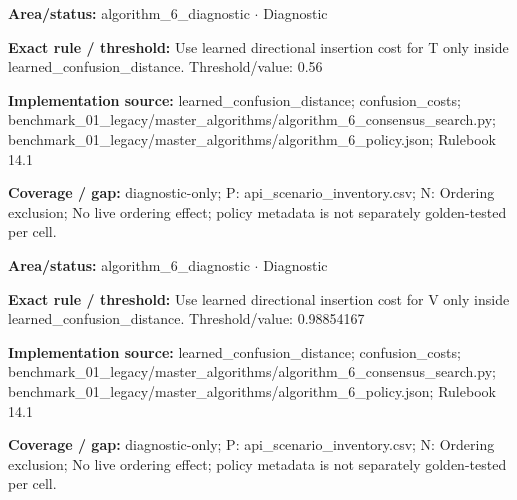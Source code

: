 \begin{tcolorbox}[enhanced,breakable,colback=white,colframe=Muted!45,boxrule=0.45pt,arc=1.5pt,left=6pt,right=6pt,top=5pt,bottom=5pt,title={\texttt{A6-LEARNED-INSERTION-T}},title after break={\texttt{A6-LEARNED-INSERTION-T}\ (continued)},fonttitle=\headingfont\bfseries\color{Navy},coltitle=Navy]
\textbf{Area/status:} algorithm\_\allowbreak{}6\_\allowbreak{}diagnostic $\boldsymbol{\cdot}$ Diagnostic\par
\smallskip
\textbf{Exact rule / threshold:} Use learned directional insertion cost for T only inside learned\_\allowbreak{}confusion\_\allowbreak{}distance. Threshold/\allowbreak{}value: 0.56\par
\smallskip
\textbf{Implementation source:} learned\_\allowbreak{}confusion\_\allowbreak{}distance; confusion\_\allowbreak{}costs; benchmark\_\allowbreak{}01\_\allowbreak{}legacy/\allowbreak{}master\_\allowbreak{}algorithms/\allowbreak{}algorithm\_\allowbreak{}6\_\allowbreak{}consensus\_\allowbreak{}search.py; benchmark\_\allowbreak{}01\_\allowbreak{}legacy/\allowbreak{}master\_\allowbreak{}algorithms/\allowbreak{}algorithm\_\allowbreak{}6\_\allowbreak{}policy.json; Rulebook 14.1\par
\smallskip
\textbf{Coverage / gap:} diagnostic-only; P: api\_\allowbreak{}scenario\_\allowbreak{}inventory.csv; N: Ordering exclusion; No live ordering effect; policy metadata is not separately golden-tested per cell.
\end{tcolorbox}
\begin{tcolorbox}[enhanced,breakable,colback=white,colframe=Muted!45,boxrule=0.45pt,arc=1.5pt,left=6pt,right=6pt,top=5pt,bottom=5pt,title={\texttt{A6-LEARNED-INSERTION-V}},title after break={\texttt{A6-LEARNED-INSERTION-V}\ (continued)},fonttitle=\headingfont\bfseries\color{Navy},coltitle=Navy]
\textbf{Area/status:} algorithm\_\allowbreak{}6\_\allowbreak{}diagnostic $\boldsymbol{\cdot}$ Diagnostic\par
\smallskip
\textbf{Exact rule / threshold:} Use learned directional insertion cost for V only inside learned\_\allowbreak{}confusion\_\allowbreak{}distance. Threshold/\allowbreak{}value: 0.98854167\par
\smallskip
\textbf{Implementation source:} learned\_\allowbreak{}confusion\_\allowbreak{}distance; confusion\_\allowbreak{}costs; benchmark\_\allowbreak{}01\_\allowbreak{}legacy/\allowbreak{}master\_\allowbreak{}algorithms/\allowbreak{}algorithm\_\allowbreak{}6\_\allowbreak{}consensus\_\allowbreak{}search.py; benchmark\_\allowbreak{}01\_\allowbreak{}legacy/\allowbreak{}master\_\allowbreak{}algorithms/\allowbreak{}algorithm\_\allowbreak{}6\_\allowbreak{}policy.json; Rulebook 14.1\par
\smallskip
\textbf{Coverage / gap:} diagnostic-only; P: api\_\allowbreak{}scenario\_\allowbreak{}inventory.csv; N: Ordering exclusion; No live ordering effect; policy metadata is not separately golden-tested per cell.
\end{tcolorbox}
